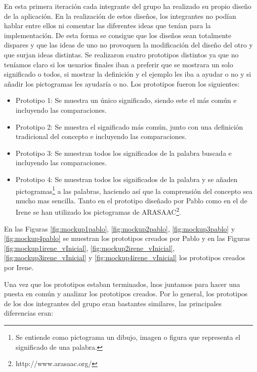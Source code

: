 En esta primera iteración cada integrante del grupo ha realizado su propio diseño de la aplicación. En la realización de estos diseños, los integrantes no podían hablar entre ellos ni comentar las diferentes ideas que tenían para la implementación. De esta forma se consigue que los diseños sean totalmente dispares y que las ideas de uno no provoquen la modificación del diseño del otro y que surjan ideas distintas.
Se realizaron cuatro prototipos distintos ya que no teníamos claro si los usuarios finales iban a preferir que se mostrara un solo significado o todos, si mostrar la definición y el ejemplo les iba a ayudar o no y si añadir los pictogramas les ayudaría o no.
Los prototipos fueron los siguientes:
\begin{itemize}
	\item Prototipo 1: Se muestra un único significado, siendo este el más común e incluyendo las comparaciones.
	\item Prototipo 2: Se muestra el significado más común, junto con una definición tradicional del concepto e incluyendo las comparaciones.
	\item Prototipo 3: Se muestran todos los significados de la palabra buscada e incluyendo las comparaciones.
	\item Prototipo 4: Se muestran todos los significados de la palabra y se añaden pictogramas\footnote{Se entiende como pictograma un dibujo, imagen o figura que representa el significado de una palabra.} a las palabras, haciendo así que la comprensión del concepto sea mucho mas sencilla. Tanto en el prototipo diseñado por Pablo como en el de Irene se han utilizado los pictogramas de ARASAAC\footnote{http://www.arasaac.org/}.
	
\end{itemize}

En las Figuras \ref{fig:mockup1pablo}, \ref{fig:mockup2pablo}, \ref{fig:mockup3pablo} y \ref{fig:mockup4pablo} se muestran los prototipos creados por Pablo y en las Figuras \ref{fig:mockup1irene_vInicial}, \ref{fig:mockup2irene_vInicial},  \ref{fig:mockup3irene_vInicial} y \ref{fig:mockup4irene_vInicial} los prototipos creados por Irene.

Una vez que los prototipos estaban terminados, lnos juntamos para hacer una puesta en común y analizar los prototipos creados. 
Por lo general, los prototipos de los dos integrantes del grupo eran bastantes similares, las principales diferencias eran:

